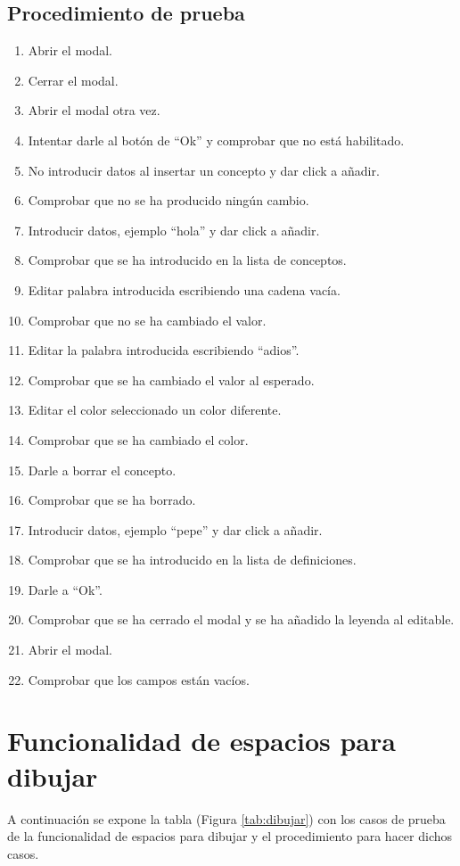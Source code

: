 \subsection{Procedimiento de prueba}
\label{procedimientoPruebas:leyenda}
\begin{enumerate}
    \item Abrir el modal.
    \item Cerrar el modal.
    \item Abrir el modal otra vez.
    \item Intentar darle al botón de ``Ok'' y comprobar que no está habilitado.
    \item No introducir datos al insertar un concepto y dar click a añadir.
    \item Comprobar que no se ha producido ningún cambio.
    \item Introducir datos, ejemplo ``hola'' y dar click a añadir.
    \item Comprobar que se ha introducido en la lista de conceptos.
    \item Editar palabra introducida escribiendo una cadena vacía.
    \item Comprobar que no se ha cambiado el valor.
    \item Editar la palabra introducida escribiendo ``adios''.
    \item Comprobar que se ha cambiado el valor al esperado.
    \item Editar el color seleccionado un color diferente.
    \item Comprobar que se ha cambiado el color.
    \item Darle a borrar el concepto.
    \item Comprobar que se ha borrado.
    \item Introducir datos, ejemplo ``pepe'' y dar click a añadir.
    \item Comprobar que se ha introducido en la lista de definiciones.
    \item Darle a ``Ok''.
    \item Comprobar que se ha cerrado el modal y se ha añadido la leyenda al editable.
    \item Abrir el modal.
    \item Comprobar que los campos están vacíos.
\end{enumerate}

\section{Funcionalidad de espacios para dibujar}
\label{planPruebas:dibujar}
A continuación se expone la tabla (Figura \ref{tab:dibujar}) con los casos de prueba de la funcionalidad de espacios para dibujar y el procedimiento para hacer dichos casos.

